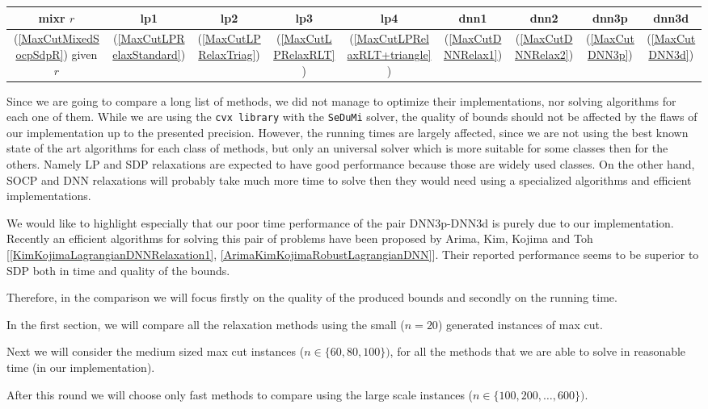 \documentclass[12pt]{book}
\theoremstyle{definition}
\begin{document}
\begin{tabular}{|c|c|c|c|c|c|c|c|c|}
\hline
mixr $r$ &
lp1 &
lp2 &
lp3 &
lp4 &
dnn1 &
dnn2 &
dnn3p &
dnn3d 	
\\ \hline
(\ref{MaxCutMixedSocpSdpR}) given $r$ &
(\ref{MaxCutLPRelaxStandard}) &
(\ref{MaxCutLPRelaxTriag}) &
(\ref{MaxCutLPRelaxRLT}) &
(\ref{MaxCutLPRelaxRLT+triangle}) &
(\ref{MaxCutDNNRelax1}) &
(\ref{MaxCutDNNRelax2}) &
(\ref{MaxCutDNN3p}) &
(\ref{MaxCutDNN3d}) \\
\hline
\end{tabular}

\bigskip


Since we are going to compare a long list of methods, we did not manage to optimize their implementations, nor solving algorithms for each one of them. While we are using the {\tt cvx library} with the {\tt SeDuMi} solver, the quality of bounds should not be affected by the flaws of our implementation up to the presented precision. However, the running times are largely affected, since we are not using the best known state of the art algorithms for each class of methods, but only an universal solver which is more suitable for some classes then for the others. Namely LP and SDP relaxations are expected to have good performance because those are widely used classes. On the other hand, SOCP and DNN relaxations will probably take much more time to solve then they would need using a specialized algorithms and efficient implementations.

\rem We would like to highlight especially that our poor time performance of the pair DNN3p-DNN3d is purely due to our implementation. Recently an efficient algorithms for solving this pair of problems have been proposed by Arima, Kim, Kojima and Toh [\ref{KimKojimaLagrangianDNNRelaxation1}, \ref{ArimaKimKojimaRobustLagrangianDNN}]. Their reported performance seems to be superior to SDP both in time and quality of the bounds.

Therefore, in the comparison we will focus firstly on the quality of the produced bounds and secondly on the running time.

In the first section, we will compare all the relaxation methods using the small ($n=20$) generated instances of max cut. 

Next we will consider the medium sized max cut instances ($n\in\{60, 80, 100\})$, for all the methods that we are able to solve in reasonable time  (in our implementation).

After this round we will choose only fast methods to compare using the large scale instances ($n\in\{100,200,\dots, 600\})$. 
\end{document}

